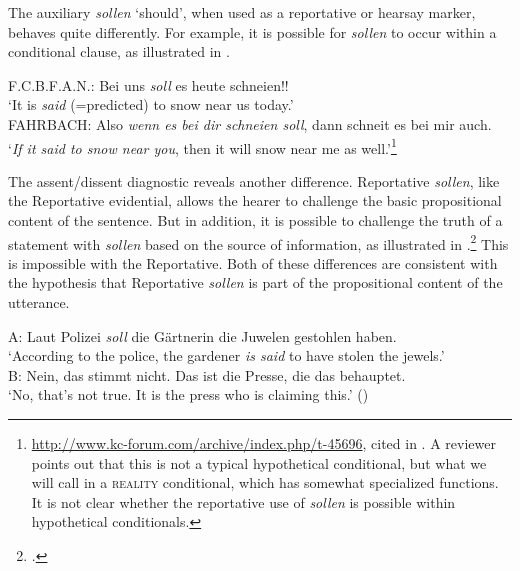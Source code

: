 The  auxiliary \textit{sollen} ‘should’, when used as a reportative or hearsay marker, behaves quite differently. For example, it is possible for \textit{sollen} to occur within a conditional clause, as illustrated in .


\ea \label{ex:17.9}
F.C.B.F.A.N.: Bei uns \textit{soll} es heute schneien!!\\
‘It is \textit{said} (=predicted) to snow near us today.’\\
FAHRBACH: Also \textit{wenn es bei dir schneien soll}, dann schneit es bei mir auch.\\
‘\textit{If it said to snow near you}, then it will snow near me as well.’\footnote{\url{http://www.kc-forum.com/archive/index.php/t-45696}, cited in \citet{Faller2006}. A reviewer points out that this is not a typical hypothetical conditional, but what we will call in  a \textsc{reality} conditional, which has somewhat specialized functions. It is not clear whether the reportative use of \textit{sollen} is possible within hypothetical conditionals.}\\
  
\z


The assent/dissent diagnostic reveals another difference.  Reportative \textit{sollen}, like the  Reportative evidential, allows the hearer to challenge the basic propositional content of the sentence. But in addition, it is possible to challenge the truth of a statement with \textit{sollen} based on the source of information, as illustrated in .\footnote{\citet{Faller2006}.} This is impossible with the  Reportative. Both of these differences are consistent with the hypothesis that  Reportative \textit{sollen} is part of the propositional content of the utterance.


\ea \label{ex:17.10}
A: Laut Polizei \textit{soll} die Gärtnerin die Juwelen gestohlen haben.\\
\glt   ‘According to the police, the gardener \textit{is said} to have stolen the jewels.’\\
\bigskip
B: Nein, das stimmt nicht. Das ist die Presse, die das behauptet.\\
\glt    ‘No, that’s not true. It is the press who is claiming this.’  (\citealt{Faller2006})
\z


